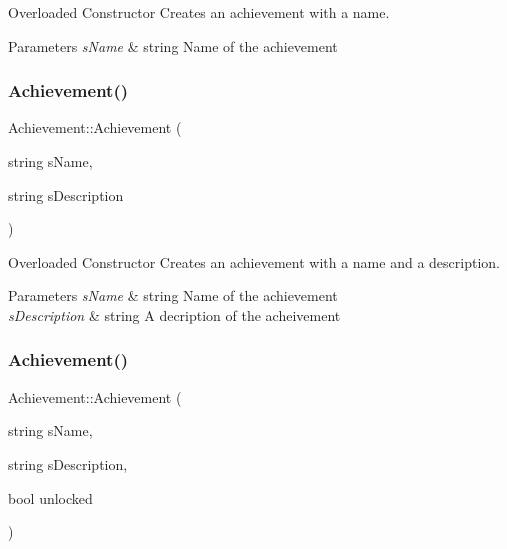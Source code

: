 Overloaded Constructor Creates an achievement with a name. 


\begin{DoxyParams}{Parameters}
{\em s\+Name} & string Name of the achievement \\
\hline
\end{DoxyParams}
\hypertarget{class_achievement_ac3d729e601b49f195f671e93422159f5}{}\label{class_achievement_ac3d729e601b49f195f671e93422159f5} 
\subsubsection{\texorpdfstring{Achievement()}{Achievement()}\hspace{0.1cm}{\footnotesize\ttfamily [2/3]}}
{\footnotesize\ttfamily Achievement\+::\+Achievement (\begin{DoxyParamCaption}\item[{string}]{s\+Name,  }\item[{string}]{s\+Description }\end{DoxyParamCaption})}



Overloaded Constructor Creates an achievement with a name and a description. 


\begin{DoxyParams}{Parameters}
{\em s\+Name} & string Name of the achievement \\
\hline
{\em s\+Description} & string A decription of the acheivement \\
\hline
\end{DoxyParams}
\hypertarget{class_achievement_a83be456772eb1bb65ba8414111b34040}{}\label{class_achievement_a83be456772eb1bb65ba8414111b34040} 
\subsubsection{\texorpdfstring{Achievement()}{Achievement()}\hspace{0.1cm}{\footnotesize\ttfamily [3/3]}}
{\footnotesize\ttfamily Achievement\+::\+Achievement (\begin{DoxyParamCaption}\item[{string}]{s\+Name,  }\item[{string}]{s\+Description,  }\item[{bool}]{unlocked }\end{DoxyParamCaption})}




